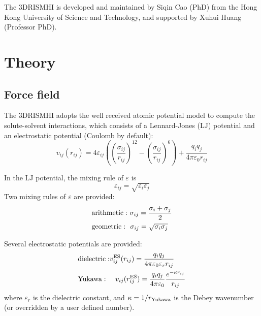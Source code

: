 \documentclass[aip,amsmath,amssymb,reprint,onecolumn]{revtex4-1}
\begin{document}
The 3DRISMHI is developed and maintained by Siqin Cao (PhD) from the Hong Kong University of Science and Technology, and supported by Xuhui Huang (Professor PhD).


\section{Theory}

\subsection{Force field}

The 3DRISMHI adopts the well received atomic potential model to compute the solute-solvent interactions, which consists of a Lennard-Jones (LJ) potential and an electrostatic potential (Coulomb by default):
\begin{equation*}
    v_{ij}(r_{ij}) = 4\varepsilon_{ij}\left(\left(\frac{\sigma_{ij}}{r_{ij}}\right)^{12} - \left(\frac{\sigma_{ij}}{r_{ij}}\right)^6 \right) + \frac{q_iq_j}{4\pi\varepsilon_0r_{ij}}
\end{equation*}

In the LJ potential, the mixing rule of $\varepsilon$ is
\begin{equation*}
    \varepsilon_{ij}=\sqrt{\varepsilon_i\varepsilon_j}
\end{equation*}
Two mixing rules of $\varepsilon$ are provided:
\begin{equation*}\begin{split}
    &{\rm arithmetic:\ } \sigma_{ij} = \frac{\sigma_i+\sigma_j}{2} \\
    &{\rm geometric:\ \ } \sigma_{ij} = \sqrt{\sigma_i\sigma_j} \\
\end{split}\end{equation*}

Several electrostatic potentials are provided:
\begin{equation*}\begin{split}
    &{\rm dielectric:} v^{\rm ES}_{ij}(r_{ij}) = \frac{q_iq_j}{4\pi\varepsilon_0\varepsilon_rr_{ij}} \\
    &{\rm Yukawa:\ \ \ \ } v_{ij}(r^{\rm ES}_{ij}) = \frac{q_iq_j}{4\pi\varepsilon_0}\frac{e^{-\kappa r_{ij}}}{r_{ij}} \\
\end{split}\end{equation*}
where $\varepsilon_r$ is the dielectric constant, and $\kappa=1/r_{\rm Yukawa}$ is the Debey wavenumber (or overridden by a user defined number).
\end{document}
